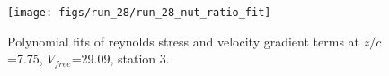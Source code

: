 \begin{figure}[H]
\centering
\texttt{[image: figs/run\_28/run\_28\_nut\_ratio\_fit]}
\caption{Polynomial fits of reynolds stress and velocity gradient terms at $z/c$=7.75, $V_{free}$=29.09, station 3.}
\label{fig:run_28_nut_ratio_fit}
\end{figure}


